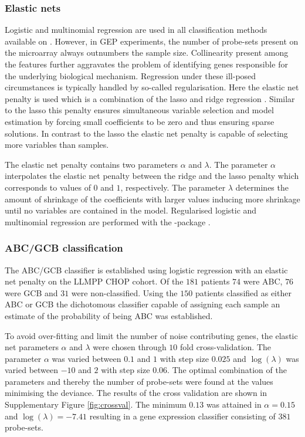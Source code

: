 \documentclass{article}
\begin{document}
\subsubsection{Elastic nets}
Logistic and multinomial regression are used in all classification methods available on \hemaClass{}.
However, in GEP experiments, the number of probe-sets present on the microarray always outnumbers the sample size.
Collinearity present among the features further aggravates the problem of identifying genes responsible for the underlying biological mechanism.
Regression under these ill-posed circumstances is typically handled by so-called regularisation.
Here the elastic net penalty \citep{Friedman2010, Zou2005} is used which is a combination of the lasso \citep{Tibshirani1996} and ridge regression \citep{Hoerl1970}.
Similar to the lasso this penalty ensures simultaneous variable selection and model estimation by forcing small coefficients to be zero and thus ensuring sparse solutions.
In contrast to the lasso the elastic net penalty is capable of selecting more variables than samples.

The elastic net penalty contains two parameters $\alpha$ and $\lambda$.
The parameter $\alpha$ interpolates the elastic net penalty between the ridge and the lasso penalty which corresponds to values of $0$ and $1$, respectively.
The parameter $\lambda$ determines the amount of shrinkage of the coefficients with larger values inducing more shrinkage until no variables are contained in the model.
Regularised logistic and multinomial regression are performed with the \R{}-package  \citep{Friedman2010}.

\subsubsection{ABC/GCB classification}
The ABC/GCB classifier is established using logistic regression with an elastic net penalty on the LLMPP CHOP cohort.
Of the $181$ patients $74$ were ABC, $76$ were GCB and $31$ were non-classified.
Using the $150$ patients classified as either ABC or GCB the dichotomous classifier capable of assigning each sample an estimate of the probability of being ABC was established.

To avoid over-fitting and limit the number of noise contributing genes, the elastic net parameters $\alpha$ and $\lambda$ were chosen through $10$ fold cross-validation.
The parameter $\alpha$ was varied between $0.1$ and $1$ with step size $0.025$ and $\log(\lambda)$ was varied between $-10$ and $2$ with step size $0.06$.
The optimal combination of the parameters and thereby the number of probe-sets were found at the values minimising the deviance.
The results of the cross validation are shown in Supplementary Figure \ref{fig:crossval}.
The minimum $0.13$ was attained in $\alpha = 0.15$ and $\log(\lambda) = -7.41$ resulting in a gene expression classifier consisting of $381$ probe-sets.
\end{document}

